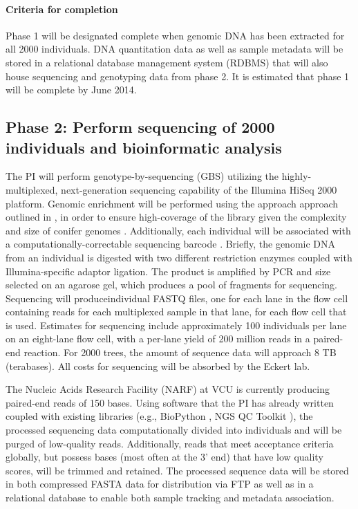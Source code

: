 \paragraph{Criteria for completion}
Phase 1 will be designated complete when genomic DNA has been extracted for all \num{2000} individuals.  DNA quantitation data as well 
as sample metadata will be stored in a relational database management system (RDBMS) that will also house sequencing and 
genotyping data from phase 2.  It is estimated that phase 1 will be complete by June 2014.

\subsection*{Phase 2: Perform sequencing of 2000 individuals and bioinformatic analysis}

The PI will perform genotype-by-sequencing (GBS) utilizing the highly-multiplexed, next-generation sequencing capability of the 
Illumina HiSeq 2000 platform.  Genomic enrichment will be performed using the approach approach outlined in 
\cite{Parchman:2012ca}, in order to ensure high-coverage of the library given the complexity and size of conifer genomes 
\citep{Mackay:2012hr}.  Additionally, each individual will be associated with a computationally-correctable sequencing 
barcode \citep{Roche454MID}.  
Briefly, the genomic DNA from an individual is digested with two different restriction enzymes coupled with Illumina-specific 
adaptor ligation.  The product is amplified by PCR and size selected on an agarose gel, which produces a pool of fragments for 
sequencing.  Sequencing will produceindividual FASTQ files, one for each lane in the flow cell containing reads for each multiplexed 
sample in that lane, for each flow cell that is used.  Estimates for sequencing include approximately 100 individuals per lane on an 
eight-lane flow cell, with a per-lane yield of 200 million reads in a paired-end reaction.  For 2000 trees, the amount of sequence data 
will approach 8 TB (terabases).  All costs for sequencing will be absorbed by the Eckert lab.   

The Nucleic Acids Research Facility (NARF) at VCU is currently producing paired-end reads of 150 bases.  Using software that the 
PI has already written \citep{code:2008wq} coupled with existing libraries (e.g., BioPython \citep{Cock:2009hj}, NGS QC Toolkit 
\citep{Patel:2012fq}), the processed sequencing data computationally divided into individuals and will be purged of 
low-quality reads. Additionally, reads that meet acceptance criteria globally, but possess bases (most often at the 3' end) 
that have low quality scores, will be trimmed and retained.  The processed sequence data will be stored in both compressed 
FASTA data for distribution via FTP as well as in a relational database to enable both sample tracking and metadata association.

